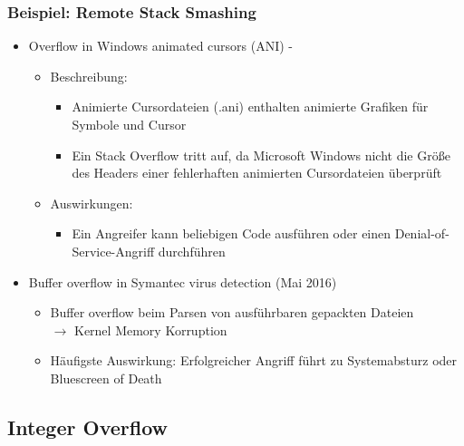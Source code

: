 \subsubsection*{Beispiel: Remote Stack Smashing}
\begin{itemize}
    \item Overflow in Windows animated cursors (ANI) - 
    \begin{itemize}
        \item Beschreibung:
        \begin{itemize}
            \item Animierte Cursordateien (.ani) enthalten animierte Grafiken für Symbole und Cursor
            \item Ein Stack Overflow tritt auf, da Microsoft Windows nicht die Größe des Headers einer fehlerhaften animierten Cursordateien überprüft
        \end{itemize}
        \item Auswirkungen:
        \begin{itemize}
            \item Ein Angreifer kann beliebigen Code ausführen oder einen Denial-of-Service-Angriff durchführen
        \end{itemize}
    \end{itemize}
    \item Buffer overflow in Symantec virus detection (Mai 2016)
    \begin{itemize}
        \item Buffer overflow beim Parsen von ausführbaren gepackten Dateien \\
        $\rightarrow$ Kernel Memory Korruption
        \item Häufigste Auswirkung: Erfolgreicher Angriff führt zu Systemabsturz oder Bluescreen of Death
    \end{itemize}
\end{itemize}
\clearpage
\subsection{Integer Overflow}
